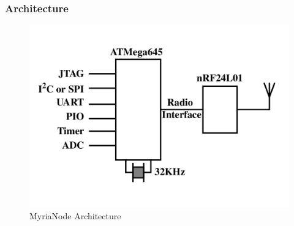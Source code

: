 \documentclass[a4paper,10pt]{report}
\begin{document}
\subsubsection{Architecture}
\begin{figure}[!h]
 \centering
 \includegraphics[width=0.5 \textwidth]{myrianodearch}
\caption{MyriaNode Architecture}
\label{myrianodearch}
\end{figure}
\end{document}
